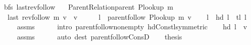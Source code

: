 \begin{isabellebody}
\endisatagproof
{\isafoldproof}%
%
\isadelimproof
\isanewline
%
\endisadelimproof
%
\isadeliminvisible
\isanewline
%
\endisadeliminvisible
%
\isataginvisible
{}\isamarkupfalse%
\ {\isacharparenleft}{\kern0pt}\ bfs{\isacharparenright}{\kern0pt}\ last{\isacharunderscore}{\kern0pt}rev{\isacharunderscore}{\kern0pt}follow{\isacharcolon}{\kern0pt}\isanewline
\ \ \ {\isachardoublequoteopen}Parent{\isacharunderscore}{\kern0pt}Relation{\isachardot}{\kern0pt}parent\ {\isacharparenleft}{\kern0pt}P{\isacharunderscore}{\kern0pt}lookup\ m{\isacharparenright}{\kern0pt}{\isachardoublequoteclose}\isanewline
\ \ \ {\isachardoublequoteopen}last\ {\isacharparenleft}{\kern0pt}rev{\isacharunderscore}{\kern0pt}follow\ m\ v{\isacharparenright}{\kern0pt}\ {\isacharequal}{\kern0pt}\ v{\isachardoublequoteclose}%
\endisataginvisible
{\isafoldinvisible}%
%
\isadeliminvisible
\isanewline
%
\endisadeliminvisible
%
\isadelimproof
%
\endisadelimproof
%
\isatagproof
{}\isamarkupfalse%
\ {\isacharminus}{\kern0pt}\isanewline
\ \ \isamarkupfalse%
\ {\isacharquery}{\kern0pt}l\ {\isacharequal}{\kern0pt}\ {\isachardoublequoteopen}parent{\isachardot}{\kern0pt}follow\ {\isacharparenleft}{\kern0pt}P{\isacharunderscore}{\kern0pt}lookup\ m{\isacharparenright}{\kern0pt}\ v{\isachardoublequoteclose}\isanewline
\ \ \isamarkupfalse%
\ {\isachardoublequoteopen}{\isacharquery}{\kern0pt}l\ {\isacharequal}{\kern0pt}\ hd\ {\isacharquery}{\kern0pt}l\ {\isacharhash}{\kern0pt}\ tl\ {\isacharquery}{\kern0pt}l{\isachardoublequoteclose}\isanewline
\ \ \ \ \isamarkupfalse%
\ assms\isanewline
\ \ \ \ \isamarkupfalse%
\ {\isacharparenleft}{\kern0pt}intro\ parent{\isachardot}{\kern0pt}follow{\isacharunderscore}{\kern0pt}non{\isacharunderscore}{\kern0pt}empty\ hd{\isacharunderscore}{\kern0pt}Cons{\isacharunderscore}{\kern0pt}tl{\isacharbrackleft}{\kern0pt}symmetric{\isacharbrackright}{\kern0pt}{\isacharparenright}{\kern0pt}\isanewline
\ \ \isamarkupfalse%
\ {\isachardoublequoteopen}hd\ {\isacharquery}{\kern0pt}l\ {\isacharequal}{\kern0pt}\ v{\isachardoublequoteclose}\isanewline
\ \ \ \ \isamarkupfalse%
\ assms\isanewline
\ \ \ \ \isamarkupfalse%
\ {\isacharparenleft}{\kern0pt}auto\ dest{\isacharcolon}{\kern0pt}\ parent{\isachardot}{\kern0pt}follow{\isacharunderscore}{\kern0pt}ConsD{\isacharparenright}{\kern0pt}\isanewline
\ \ \isamarkupfalse%
\ {\isacharquery}{\kern0pt}thesis\isanewline
\ \ \ \ \isamarkupfalse%

\end{isabellebody}
